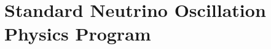 \chapter{Standard Neutrino Oscillation Physics Program}
\label{ch:osc}















%









%

%













